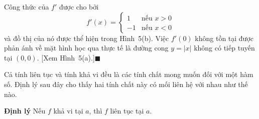 \begin{minipage}[t]{0.70\textwidth}
    \vspace{0.4em}
    Công thức của $f'$ được cho bởi
    \[
        f'(x) = \begin{cases}
            1 & \text{nếu } x > 0 \\[2pt]
            -1 & \text{nếu } x < 0
        \end{cases}
    \]
    và đồ thị của nó được thể hiện trong Hình~5(b). Việc $f'(0)$ không tồn tại được phản ánh về mặt hình học qua thực tế là đường cong $y = |x|$ không có tiếp tuyến tại $(0, 0)$. [Xem Hình~5(a).]\hfill{\color{stewartcyan}$\blacksquare$}

    \vspace{1.0em}
    Cả tính liên tục và tính khả vi đều là các tính chất mong muốn đối với một hàm số. Định lý sau đây cho thấy hai tính chất này có mối liên hệ với nhau như thế nào.

    \vspace{0.8em}
    \begin{tcolorbox}[
        colback=white,
        colframe=stewartred,
        boxrule=0.8pt,
        arc=0mm,
        left=8pt,
        right=8pt,
        top=7pt,
        bottom=7pt
    ]
        \noindent
        \hspace{8pt}%
        {\bfseries\color{stewartred}\textsf{Định lý}}\quad
        Nếu $f$ khả vi tại $a$, thì $f$ liên tục tại $a$.
    \end{tcolorbox}
\end{minipage}
